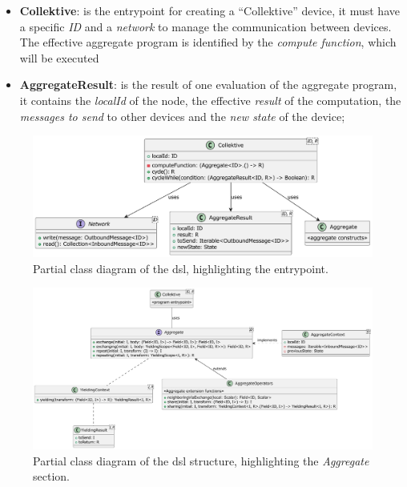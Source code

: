\begin{itemize}
    \item \textbf{Collektive}: is the entrypoint for creating a ``Collektive'' device, it must have a specific \emph{ID} and a
        \emph{network} to manage the communication between devices.
        The effective aggregate program is identified by the \emph{compute function}, which will be executed
    \item \textbf{AggregateResult}: is the result of one evaluation of the aggregate program, it contains the \emph{localId}
        of the node, the effective \emph{result} of the computation, the \emph{messages to send} to other devices and the \emph{new state} of the device;
\end{itemize}

\begin{figure}
    \centering
    \includegraphics[width=\textwidth]{figures/entrypoint-class-diagram}
    \caption{Partial class diagram of the \ac{dsl}, highlighting the entrypoint.}
    \label{fig:entrypoint-class-diagram}
\end{figure}

\begin{figure}
    \centering
    \includegraphics[width=\textwidth]{figures/aggregate-class-diagram}
    \caption{Partial class diagram of the \ac{dsl} structure, highlighting the \emph{Aggregate} section.}
    \label{fig:aggregate-class-diagram}
\end{figure}

